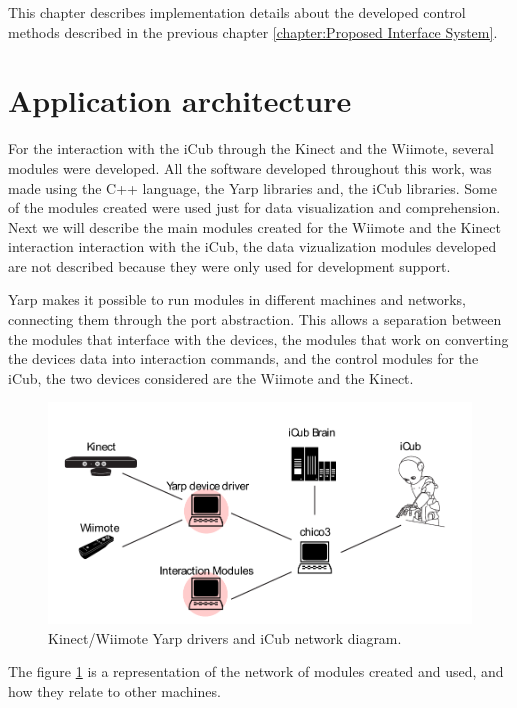
	This chapter describes implementation details about the developed control methods described in the previous chapter \ref{chapter:Proposed Interface System}.

\section{Application architecture}

	For the interaction with the iCub through the Kinect and the \ac{Wiimote}, several modules were developed. All the software developed throughout this work, was made using the C++ language, the Yarp libraries and, the iCub libraries. Some of the modules created were used just for data visualization and comprehension. Next we will describe the main modules created for the \ac{Wiimote} and the Kinect interaction interaction with the iCub, the data vizualization modules developed are not described because they were only used for development support.
	
	\ac{Yarp} makes it possible to run modules in different machines and networks, connecting them through the port abstraction. This allows a separation between the modules that interface with the devices, the modules that work on converting the devices data into interaction commands, and the control modules for the iCub, the two devices considered are the \ac{Wiimote} and the Kinect.

	\begin{figure}[htb]
	\begin{center}
	\includegraphics[width=120mm,page=1,angle=0]{icubSimpleNetworkDiagramMafalda-crop.pdf}
	\end{center}
	\caption[iCub Network Diagram]{Kinect/\ac{Wiimote} Yarp drivers and iCub network diagram.} 
	\label{fig:iCubNetDiagram}
	\end{figure}

	The figure \ref{fig:iCubNetDiagram} is a representation of the network of modules created and used, and how they relate to other machines.
	
